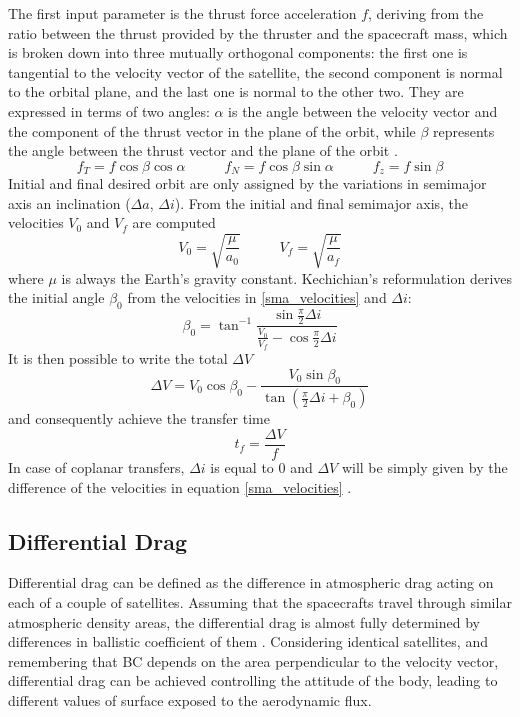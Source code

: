 The first input parameter is the thrust force acceleration $f$, deriving from the ratio between the thrust provided by the thruster and the spacecraft mass, which is broken down into three mutually orthogonal components:
the first one is tangential to the velocity vector of the satellite, the second component is normal to the orbital plane, and the last one is normal to the other two.
They are expressed in terms of two angles: 
$\alpha$ is the angle between the velocity vector and the component of the thrust vector in the plane of the orbit,
while $\beta$ represents the angle between the thrust vector and the plane of the orbit \cite{edelbaum1961propulsion}.
\begin{equation} \label{acceleration_thrust_components}
    f_T = f \cos{\beta} \cos{\alpha} \;\;\;\;\;\;\;\;\;\; f_N = f \cos{\beta} \sin{\alpha} \;\;\;\;\;\;\;\;\;\; f_z = f \sin{\beta}
\end{equation}
Initial and final desired orbit are only assigned by the variations in semimajor axis an inclination ($\Delta a$, $\Delta i$).
From the initial and final semimajor axis, the velocities $V_0$ and $V_f$ are computed 
\begin{equation} \label{sma_velocities}
    V_0 = \sqrt{\frac{\mu}{a_0}} \;\;\;\;\;\;\;\;\;\; V_f = \sqrt{\frac{\mu}{a_f}}
\end{equation}
where $\mu$ is always the Earth's gravity constant.
Kechichian's reformulation derives the initial angle $\beta_0$ from the velocities in \ref{sma_velocities} and $\Delta i$:
\begin{equation} \label{beta0}
    \beta_0 = \tan^{-1}{\frac{\sin{\frac{\pi}{2}}\Delta i}{\frac{V_0}{V_f} - \cos{\frac{\pi}{2}}\Delta i}}
\end{equation}
It is then possible to write the total $\Delta V$
\begin{equation} \label{deltaV}
    \Delta V = V_0 \cos{\beta_0} - \frac{V_0 \sin{\beta_0}}{\tan{\left(\frac{\pi}{2}\Delta i + \beta_0\right)}}
\end{equation}
and consequently achieve the transfer time
\begin{equation} \label{transfer_time}
    t_f = \frac{\Delta V}{f}
\end{equation}
In case of coplanar transfers, $\Delta i$ is equal to 0 and $\Delta V$ will be simply given by the difference of the velocities in equation \ref{sma_velocities} \cite{kechichian1992reformulation}.


\subsection{Differential Drag}
Differential drag can be defined as the difference in atmospheric drag acting on each of a couple of satellites.
Assuming that the spacecrafts travel through similar atmospheric density areas, the differential drag is almost fully determined by differences in ballistic coefficient of them \cite{leonard1991formationkeeping}.
Considering identical satellites, and remembering that BC depends on the area perpendicular to the velocity vector, differential drag can be achieved controlling the attitude of the body, leading to different values of surface exposed to the aerodynamic flux. 

